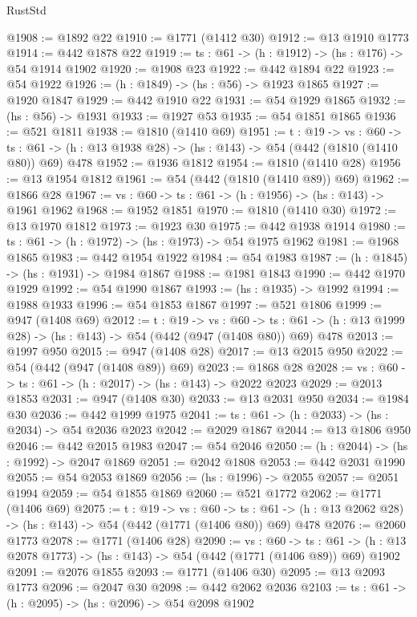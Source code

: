 \begin{lexlean}{RustStd}
\begin{coremodule}
@1908 := @1892 @22
@1910 := @1771 (@1412 @30)
@1912 := @13 @1910 @1773
@1914 := @442 @1878 @22
@1919 := {ts : @61} -> (h : @1912) -> (hs : @176) -> @54 @1914 @1902
@1920 := @1908 @23
@1922 := @442 @1894 @22
@1923 := @54 @1922
@1926 := (h : @1849) -> (hs : @56) -> @1923 @1865
@1927 := @1920 @1847
@1929 := @442 @1910 @22
@1931 := @54 @1929 @1865
@1932 := (hs : @56) -> @1931
@1933 := @1927 @53
@1935 := @54 @1851 @1865
@1936 := @521 @1811
@1938 := @1810 (@1410 @69)
@1951 := {t : @19} ->
  {vs : @60} ->
  {ts : @61} -> (h : @13 @1938 @28) -> (hs : @143) -> @54 (@442 (@1810 (@1410 @80)) @69) @478
@1952 := @1936 @1812
@1954 := @1810 (@1410 @28)
@1956 := @13 @1954 @1812
@1961 := @54 (@442 (@1810 (@1410 @89)) @69)
@1962 := @1866 @28
@1967 := {vs : @60} -> {ts : @61} -> (h : @1956) -> (hs : @143) -> @1961 @1962
@1968 := @1952 @1851
@1970 := @1810 (@1410 @30)
@1972 := @13 @1970 @1812
@1973 := @1923 @30
@1975 := @442 @1938 @1914
@1980 := {ts : @61} -> (h : @1972) -> (hs : @1973) -> @54 @1975 @1962
@1981 := @1968 @1865
@1983 := @442 @1954 @1922
@1984 := @54 @1983
@1987 := (h : @1845) -> (hs : @1931) -> @1984 @1867
@1988 := @1981 @1843
@1990 := @442 @1970 @1929
@1992 := @54 @1990 @1867
@1993 := (hs : @1935) -> @1992
@1994 := @1988 @1933
@1996 := @54 @1853 @1867
@1997 := @521 @1806
@1999 := @947 (@1408 @69)
@2012 := {t : @19} ->
  {vs : @60} ->
  {ts : @61} -> (h : @13 @1999 @28) -> (hs : @143) -> @54 (@442 (@947 (@1408 @80)) @69) @478
@2013 := @1997 @950
@2015 := @947 (@1408 @28)
@2017 := @13 @2015 @950
@2022 := @54 (@442 (@947 (@1408 @89)) @69)
@2023 := @1868 @28
@2028 := {vs : @60} -> {ts : @61} -> (h : @2017) -> (hs : @143) -> @2022 @2023
@2029 := @2013 @1853
@2031 := @947 (@1408 @30)
@2033 := @13 @2031 @950
@2034 := @1984 @30
@2036 := @442 @1999 @1975
@2041 := {ts : @61} -> (h : @2033) -> (hs : @2034) -> @54 @2036 @2023
@2042 := @2029 @1867
@2044 := @13 @1806 @950
@2046 := @442 @2015 @1983
@2047 := @54 @2046
@2050 := (h : @2044) -> (hs : @1992) -> @2047 @1869
@2051 := @2042 @1808
@2053 := @442 @2031 @1990
@2055 := @54 @2053 @1869
@2056 := (hs : @1996) -> @2055
@2057 := @2051 @1994
@2059 := @54 @1855 @1869
@2060 := @521 @1772
@2062 := @1771 (@1406 @69)
@2075 := {t : @19} ->
  {vs : @60} ->
  {ts : @61} -> (h : @13 @2062 @28) -> (hs : @143) -> @54 (@442 (@1771 (@1406 @80)) @69) @478
@2076 := @2060 @1773
@2078 := @1771 (@1406 @28)
@2090 := {vs : @60} ->
  {ts : @61} -> (h : @13 @2078 @1773) -> (hs : @143) -> @54 (@442 (@1771 (@1406 @89)) @69) @1902
@2091 := @2076 @1855
@2093 := @1771 (@1406 @30)
@2095 := @13 @2093 @1773
@2096 := @2047 @30
@2098 := @442 @2062 @2036
@2103 := {ts : @61} -> (h : @2095) -> (hs : @2096) -> @54 @2098 @1902

\end{coremodule}
\end{lexlean}
